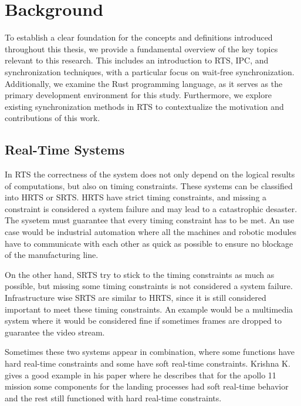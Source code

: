 \chapter{Background}\label{ch:background}

To establish a clear foundation for the concepts and definitions introduced throughout this thesis, we provide a fundamental overview of the key topics relevant to this research. This includes an introduction to \ac{RTS}, \acf{IPC}, and synchronization techniques, with a particular focus on wait-free synchronization. Additionally, we examine the Rust programming language, as it serves as the primary development environment for this study. Furthermore, we explore existing synchronization methods in \ac{RTS} to contextualize the motivation and contributions of this work.

\section{Real-Time Systems}\label{sec:real-time}

In \ac{RTS} the correctness of the system does not only depend on the logical results of computations, but also on timing constraints. These systems can be classified into \ac{HRTS} or \ac{SRTS}. \ac{HRTS} have strict timing constraints, and missing a constraint is considered a system failure and may lead to a catastrophic desaster. The sysetem must guarantee that every timing constraint has to be met. An use case would be industrial automation where all the machines and robotic modules have to communicate with each other as quick as possible to ensure no blockage of the manufacturing line. \cite{HardSoftRealTime}

On the other hand, \ac{SRTS} try to stick to the timing constraints as much as possible, but missing some timing constraints is not considered a system failure. Infrastructure wise \ac{SRTS} are similar to \ac{HRTS}, since it is still considered important to meet these timing constraints. An example would be a multimedia system where it would be considered fine if sometimes frames are dropped to guarantee the video stream. \cite{HardSoftRealTime}

Sometimes these two systems appear in combination, where some functions have hard real-time constraints and some have soft real-time constraints. Krishna K. gives a good example in his paper where he describes that for the apollo 11 mission some components for the landing processes had soft real-time behavior and the rest still functioned with hard real-time constraints. \cite{HardSoftRealTime}


